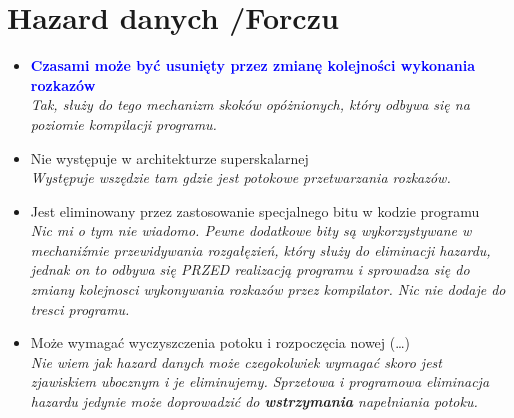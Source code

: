 \section{Hazard danych {\small /Forczu}}
	\begin{itemize}
    \item \textcolor{Blue}{\textbf{Czasami może być usunięty przez zmianę kolejności wykonania rozkazów}}\\
    {\small \emph{Tak, służy do tego mechanizm skoków opóżnionych, który odbywa się na poziomie kompilacji programu.}}
    \item Nie występuje w architekturze superskalarnej\\
    {\small \emph{Występuje wszędzie tam gdzie jest potokowe przetwarzania rozkazów.}}
    \item Jest eliminowany przez zastosowanie specjalnego bitu w kodzie programu\\
    {\small \emph{Nic mi o tym nie wiadomo. Pewne dodatkowe bity są wykorzystywane w mechaniźmie przewidywania rozgałęzień, który służy do eliminacji hazardu, jednak on to odbywa się PRZED realizacją programu i sprowadza się do zmiany kolejnosci wykonywania rozkazów przez kompilator. Nic nie dodaje do tresci programu.}}
    \item Może wymagać wyczyszczenia potoku i rozpoczęcia nowej (…)\\
    {\small \emph{Nie wiem jak hazard danych może czegokolwiek wymagać skoro jest zjawiskiem ubocznym i je eliminujemy. Sprzetowa i programowa eliminacja hazardu jedynie może doprowadzić do \textbf{wstrzymania} napełniania potoku.}}
    \end{itemize}


